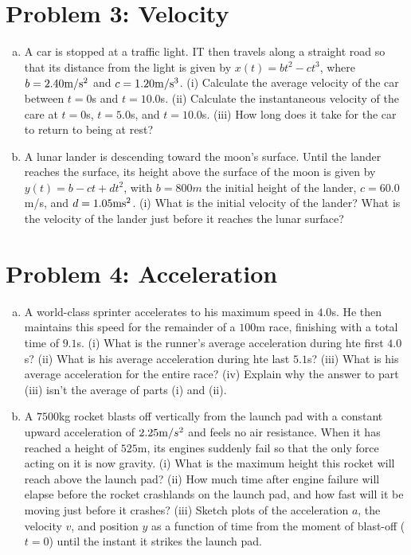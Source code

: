 \documentclass[10pt,letter]{article}
\begin{document}
\section*{Problem 3: Velocity}
\begin{enumerate}[(a)]
\item A car is stopped at a traffic light. IT then travels along a straight road so that its distance from the light is given by $x(t) = bt^2 - ct^3$, where $b = 2.40 {\rm m}/{\rm s}^2$ and $c = 1.20 {\rm m}/{\rm s}^3$. (i) Calculate the average velocity of the car between $t = 0$s and $t = 10.0$s. (ii) Calculate the instantaneous velocity of the care at $t = 0$s, $t = 5.0$s, and $t = 10.0$s. (iii) How long does it take for the car to return to being at rest? 
\item A lunar lander is descending toward the moon's surface. Until the lander reaches the surface, its height above the surface of the moon is given by $y(t) = b - ct + dt^2$, with $b = 800 m$ the initial height of the lander, $c = 60.0 $m/s, and $d = 1.05 {\rm m}{\rm s}^2$.  (i) What is the initial velocity of the lander? What is the velocity of the lander just before it reaches the lunar surface?
\end{enumerate}
\section*{Problem 4: Acceleration}
\begin{enumerate}[(a)]
\item A world-class sprinter accelerates to his maximum speed in $4.0$s. He then maintains this speed for the remainder of a $100$m race, finishing with a total time of $9.1$s. (i) What is the runner's average acceleration during hte first $4.0$s? (ii) What is his average acceleration during hte last $5.1$s? (iii) What is his average acceleration for the entire race? (iv) Explain why the answer to part (iii) isn't the average of parts (i) and (ii).
\item A $7500$kg rocket blasts off vertically from the launch pad with a constant upward acceleration of $2.25 {\rm m}/{s^2}$ and feels no air resistance. When it has reached a height of $525$m, its engines suddenly fail so that the only force acting on it is now gravity. (i) What is the maximum height this rocket will reach above the launch pad? (ii) How much time after engine failure will elapse before the rocket crashlands on the launch pad, and how fast will it be moving just before it crashes? (iii) Sketch plots of the acceleration $a$, the velocity $v$, and position $y$ as a function of time from the moment of blast-off ($t = 0$) until the instant it strikes the launch pad.
\end{enumerate}
\end{document}
